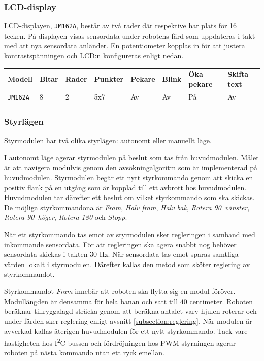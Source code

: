 \documentclass[11pt]{article}
\begin{document}
\begin{flushleft}
\subsubsection{LCD-display}
LCD-displayen, \verb+JM162A+, består av två rader där respektive har plats för 16 tecken. På displayen visas sensordata under robotens färd som uppdateras i takt med att nya sensordata anländer. En potentiometer kopplas in för att justera kontrastspänningen och LCD:n konfigureras enligt nedan.

\begin{center}
  \begin{tabular}{l l l l l l l l}
      \textbf{Modell} & \textbf{Bitar} & \textbf{Rader} & \textbf{Punkter} & \textbf{Pekare} & \textbf{Blink} & \textbf{Öka pekare} & \textbf{Skifta text} \\
      \verb+JM162A+ & 8 & 2 & 5x7 & Av & Av & På & Av \\
    \end{tabular}
  \end{center}

\subsubsection{Styrlägen}
Styrmodulen har två olika styrlägen: autonomt eller manuellt läge.
\begin{description}[style=unboxed, leftmargin=0cm]
  \item[Autonomt läge]
    I autonomt läge agerar styrmodulen på beslut som tas från huvudmodulen. Målet är att navigera modulvis genom den avsökningalgoritm som är implementerad på huvudmodulen. Styrmodulen begär ett nytt styrkommando genom att skicka en positiv flank på en utgång som är kopplad till ett avbrott hos huvudmodulen. Huvudmodulen tar därefter ett beslut om vilket styrkommando som ska skickas. De möjliga styrkommandona är \textit{Fram}, \textit{Halv fram}, \textit{Halv bak}, \textit{Rotera 90\textdegree\ vänster}, \textit{Rotera 90\textdegree\ höger}, \textit{Rotera 180\textdegree} och \textit{Stopp}. 

När ett styrkommando tas emot av styrmodulen sker regleringen i samband med inkommande sensordata. För att regleringen ska agera snabbt nog behöver sensordata skickas i takten $30$ Hz. När sensordata tas emot sparas samtliga värden lokalt i styrmodulen. Därefter kallas den metod som sköter reglering av styrkommandot. 

Styrkommandot \textit{Fram} innebär att roboten ska flytta sig en modul föröver. Modullängden är densamma för hela banan och satt till $40$ centimeter. Roboten beräknar tillryggalagd sträcka genom att beräkna antalet varv hjulen roterar och under färden sker reglering enligt avsnitt \ref{subsection:reglering}. När modulen är avverkad kallas återigen huvudmodulen för ett nytt styrkommando. Tack vare hastigheten hos I\textsuperscript{2}C-bussen och fördröjningen hos PWM-styrningen agerar roboten på nästa kommando utan ett ryck emellan. 


\end{description}
\end{flushleft}
\end{document}

